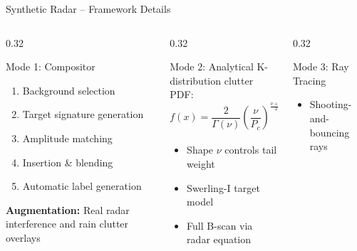 \documentclass[aspectratio=169, 10pt]{beamer}
\begin{document}
\begin{frame}{Synthetic Radar -- Framework Details}
  \begin{columns}[T]
    \begin{column}{0.32\textwidth}
      \begin{block}{\scriptsize\textcolor{Garnet}{Mode 1: Compositor}}
        {\scriptsize
        \begin{enumerate}\setlength{\itemsep}{0pt}
          \item Background selection
          \item Target signature generation
          \item Amplitude matching
          \item Insertion \& blending
          \item Automatic label generation
        \end{enumerate}
        \vspace{0.2em}
        \textbf{Augmentation:} Real radar interference and rain clutter overlays}
      \end{block}
    \end{column}
    \begin{column}{0.32\textwidth}
      \begin{block}{\scriptsize\textcolor{Atlantic}{Mode 2: Analytical}}
        {\scriptsize K-distribution clutter PDF:}
        \vspace{-0.2em}
        \[
          \scriptstyle f(x) = \frac{2}{\Gamma(\nu)} \left(\frac{\nu}{P_c}\right)^{\frac{\nu+1}{2}} x^\nu K_{\nu-1}\left(2\sqrt{\frac{\nu x}{P_c}}\right)
        \]
        \vspace{-0.6em}
        {\scriptsize
        \begin{itemize}\setlength{\itemsep}{0pt}
          \item Shape $\nu$ controls tail weight
          \item Swerling-I target model
          \item Full B-scan via radar equation
        \end{itemize}
        }
      \end{block}
    \end{column}
    \begin{column}{0.32\textwidth}
      \begin{block}{\scriptsize\textcolor{Congaree}{Mode 3: Ray Tracing}}
        {\scriptsize
        \begin{itemize}\setlength{\itemsep}{0pt}
          \item Shooting-and-bouncing rays

\end{itemize}}
\end{block}
\end{column}
\end{columns}
\end{frame}
\end{document}
